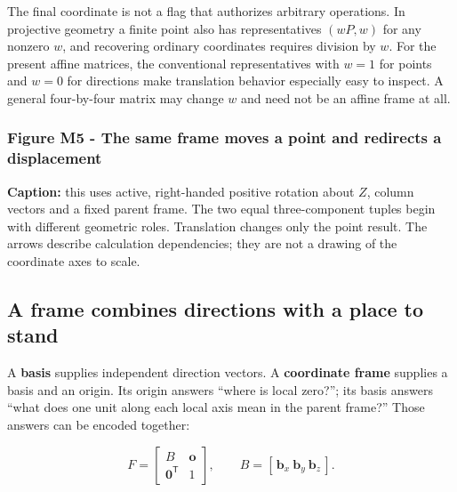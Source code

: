 The final coordinate is not a flag that authorizes arbitrary operations. In projective geometry a finite point also has representatives \((wP,w)\) for any nonzero \(w\), and recovering ordinary coordinates requires division by \(w\). For the present affine matrices, the conventional representatives with \(w=1\) for points and \(w=0\) for directions make translation behavior especially easy to inspect. A general four-by-four matrix may change \(w\) and need not be an affine frame at all.

\subsubsection{Figure M5 - The same frame moves a point and redirects a displacement}\label{01-foundations-i-ch018-figure-m5---the-same-frame-moves-a-point-and-redirects-a-displacement}

\hypertarget{01-foundations-i-ch018-figure-m5---the-same-frame-moves-a-point-and-redirects-a-displacement}{}


\textbf{Caption:} this uses active, right-handed positive rotation about \(Z\), column vectors and a fixed parent frame. The two equal three-component tuples begin with different geometric roles. Translation changes only the point result. The arrows describe calculation dependencies; they are not a drawing of the coordinate axes to scale.

\subsection{A frame combines directions with a place to stand}\label{01-foundations-i-ch018-a-frame-combines-directions-with-a-place-to-stand}

\hypertarget{01-foundations-i-ch018-a-frame-combines-directions-with-a-place-to-stand}{}

A \textbf{basis} supplies independent direction vectors. A \textbf{coordinate frame} supplies a basis and an origin. Its origin answers ``where is local zero?''; its basis answers ``what does one unit along each local axis mean in the parent frame?'' Those answers can be encoded together:

\[
F=\begin{bmatrix}B&\mathbf o\\\mathbf0^{\mathsf T}&1\end{bmatrix},
\qquad B=[\,\mathbf b_x\ \mathbf b_y\ \mathbf b_z\,].
\]

